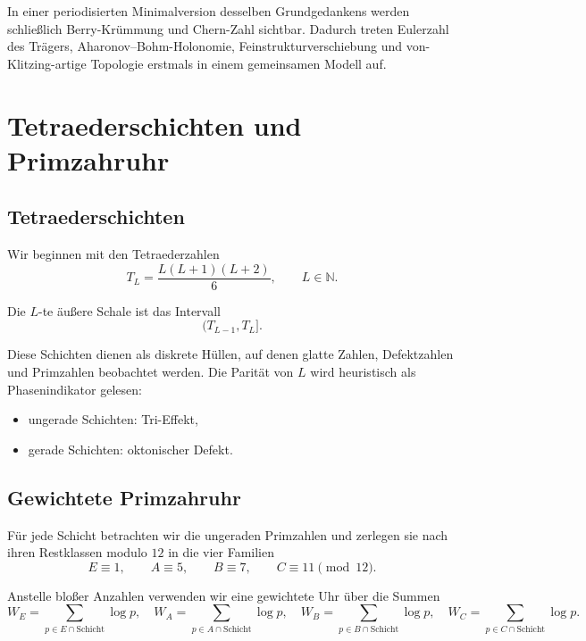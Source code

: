 \documentclass[11pt,a4paper]{article}
\theoremstyle{remark}
\newcommand{\N}{\mathbb{N}}
\begin{document}
	In einer periodisierten Minimalversion desselben Grundgedankens werden schließlich Berry-Krümmung und Chern-Zahl sichtbar. Dadurch treten Eulerzahl des Trägers, Aharonov--Bohm-Holonomie, Feinstrukturverschiebung und von-Klitzing-artige Topologie erstmals in einem gemeinsamen Modell auf.
	
	\section{Tetraederschichten und Primzahruhr}
	
	\subsection{Tetraederschichten}
	
	Wir beginnen mit den Tetraederzahlen
	\begin{equation}
		T_L = \frac{L(L+1)(L+2)}{6},\qquad L\in\N.
	\end{equation}
	
	Die $L$-te äußere Schale ist das Intervall
	\begin{equation}
		(T_{L-1},T_L].
	\end{equation}
	
	Diese Schichten dienen als diskrete Hüllen, auf denen glatte Zahlen, Defektzahlen und Primzahlen beobachtet werden. Die Parität von $L$ wird heuristisch als Phasenindikator gelesen:
	\begin{itemize}
		\item ungerade Schichten: Tri-Effekt,
		\item gerade Schichten: oktonischer Defekt.
	\end{itemize}
	
	\subsection{Gewichtete Primzahruhr}
	
	Für jede Schicht betrachten wir die ungeraden Primzahlen und zerlegen sie nach ihren Restklassen modulo $12$ in die vier Familien
	\begin{equation}
		E\equiv 1,\qquad A\equiv 5,\qquad B\equiv 7,\qquad C\equiv 11\pmod{12}.
	\end{equation}
	
	Anstelle bloßer Anzahlen verwenden wir eine gewichtete Uhr über die Summen
	\begin{equation}
		W_E = \sum_{p\in E\cap \text{Schicht}} \log p,
		\quad
		W_A = \sum_{p\in A\cap \text{Schicht}} \log p,
		\quad
		W_B = \sum_{p\in B\cap \text{Schicht}} \log p,
		\quad
		W_C = \sum_{p\in C\cap \text{Schicht}} \log p.
	\end{equation}
	
\end{document}
